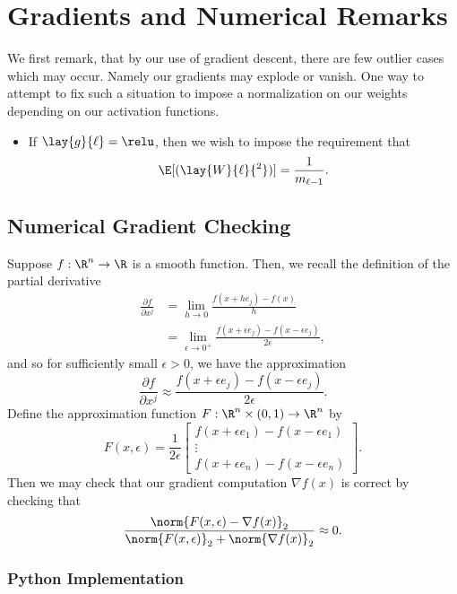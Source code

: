 

\section{Gradients and Numerical Remarks}

We first remark, that by our use of gradient descent, there are few outlier cases which may occur.  Namely our gradients may explode or vanish.  One way to attempt to fix such a situation to impose a normalization on our weights depending on our activation functions.
\begin{itemize}
	\item If $\lay{g}{\ell}=\relu$, then we wish to impose the requirement that
		$$\E[(\lay{W}{\ell}{^2})]=\frac{1}{m_{\ell-1}}.$$
\end{itemize}


\subsection{Numerical Gradient Checking}

Suppose $f:\R^n\to\R$ is a smooth function.  Then, we recall the definition of the partial derivative
\begin{align*}
	\frac{\partial f}{\partial x^j}&=\lim_{h\to0}\frac{f(x+he_j)-f(x)}{h}\\
	&=\lim_{\epsilon\to0^+}\frac{f(x+\epsilon e_j)-f(x-\epsilon e_j)}{2\epsilon},
\end{align*}
and so for sufficiently small $\epsilon>0$, we have the approximation
$$\frac{\partial f}{\partial x^j}\approx \frac{f(x+\epsilon e_j)-f(x-\epsilon e_j)}{2\epsilon}.$$
Define the approximation function $F:\R^n\times (0,1)\to\R^n$ by
$$F(x,\epsilon)=\frac{1}{2\epsilon}\begin{bmatrix}
	f(x+\epsilon e_1)-f(x-\epsilon e_1)\\
	\vdots\\
	f(x+\epsilon e_n)-f(x-\epsilon e_n)
\end{bmatrix}.$$
Then we may check that our gradient computation $\nabla f(x)$ is correct by checking that
$$\frac{\norm{F(x,\epsilon)-\nabla f(x)}_2}{\norm{F(x,\epsilon)}_2+\norm{\nabla f(x)}_2}\approx 0.$$

\subsubsection{Python Implementation}




